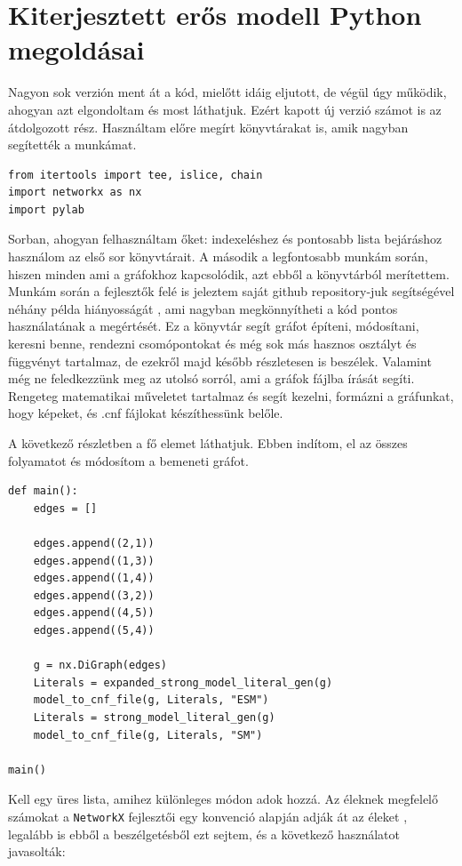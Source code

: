 \documentclass[
]{thesis-ekf}
\theoremstyle{definition}
\theoremstyle{remark}
\begin{document}
	\section{Kiterjesztett erős modell Python megoldásai}
	
	Nagyon sok verzión ment át a kód, mielőtt idáig eljutott, de végül úgy működik, ahogyan azt elgondoltam és most láthatjuk. Ezért kapott új verzió számot is az átdolgozott rész. Használtam előre megírt könyvtárakat is, amik nagyban segítették a munkámat.

	\begin{lstlisting}
from itertools import tee, islice, chain
import networkx as nx
import pylab
	\end{lstlisting}

	Sorban, ahogyan felhasználtam őket: indexeléshez és pontosabb lista bejáráshoz használom az első sor könyvtárait. A második a legfontosabb munkám során, hiszen minden ami a gráfokhoz kapcsolódik, azt ebből a könyvtárból merítettem. Munkám során a fejlesztők felé is jeleztem saját github repository-juk segítségével néhány példa hiányosságát \cite{link-github-issue}, ami nagyban megkönnyítheti a kód pontos használatának a megértését. Ez a könyvtár segít gráfot építeni, módosítani, keresni benne, rendezni csomópontokat és még sok más hasznos osztályt és függvényt tartalmaz, de ezekről majd később részletesen is beszélek. Valamint még ne feledkezzünk meg az utolsó sorról, ami a gráfok fájlba írását segíti. Rengeteg matematikai műveletet tartalmaz és segít kezelni, formázni a gráfunkat, hogy képeket, és .cnf fájlokat készíthessünk belőle.
	
	A következő részletben a fő elemet láthatjuk. Ebben indítom, el az összes folyamatot és módosítom a bemeneti gráfot.
	
	\begin{lstlisting}
def main():
	edges = []
	
	edges.append((2,1))
	edges.append((1,3))
	edges.append((1,4))
	edges.append((3,2))
	edges.append((4,5))
	edges.append((5,4))
	
	g = nx.DiGraph(edges)
	Literals = expanded_strong_model_literal_gen(g)
	model_to_cnf_file(g, Literals, "ESM")
	Literals = strong_model_literal_gen(g)
	model_to_cnf_file(g, Literals, "SM")
	
main()
	\end{lstlisting}

	Kell egy üres lista, amihez különleges módon adok hozzá. Az éleknek megfelelő számokat a \texttt{NetworkX} fejlesztői egy konvenció alapján adják át az éleket \cite{link-github-issue}, legalább is ebből a beszélgetésből ezt sejtem, és a következő használatot javasolták:
	
\end{document}
